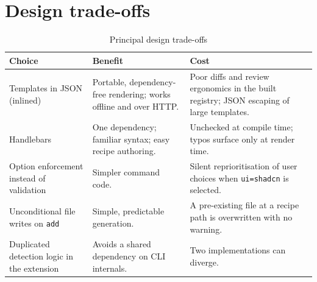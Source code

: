 \section{Design trade-offs}

\begin{longtable}{p{4.6cm}p{4.4cm}p{5cm}}
\caption{Principal design trade-offs}\\
\toprule
\textbf{Choice} & \textbf{Benefit} & \textbf{Cost} \\
\midrule

Templates in JSON (inlined) & Portable, dependency-free rendering; works offline and over HTTP. & Poor diffs and review ergonomics in the built registry; JSON escaping of large templates. \\
Handlebars & One dependency; familiar syntax; easy recipe authoring. & Unchecked at compile time; typos surface only at render time. \\
Option enforcement instead of validation & Simpler command code. & Silent reprioritisation of user choices when \texttt{ui=shadcn} is selected. \\
Unconditional file writes on \texttt{add} & Simple, predictable generation. & A pre-existing file at a recipe path is overwritten with no warning. \\
Duplicated detection logic in the extension & Avoids a shared dependency on CLI internals. & Two implementations can diverge. \\
\bottomrule
\end{longtable}
